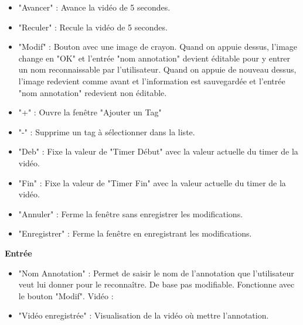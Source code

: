 \documentclass[11pt,french,a4paper]{report}
\begin{document}
\begin{multicols}{2}
\begin{small}
\begin{itemize}[label=, leftmargin=*,parsep=0cm,itemsep=0cm,topsep=0cm]
        \item "Avancer" : Avance la vidéo de 5 secondes.
        \item "Reculer" : Recule la vidéo de 5 secondes.
        \item "Modif" : Bouton avec une image de crayon. Quand on appuie dessus, l'image change en "OK" et l'entrée "nom annotation" devient éditable
        pour y entrer un nom reconnaissable par l'utilisateur. Quand on appuie de nouveau dessus, l'image redevient comme avant et
        l'information est sauvegardée et l'entrée "nom annotation" redevient non éditable.
        \item "+" : Ouvre la fenêtre "Ajouter un Tag"
        \item "-" : Supprime un tag à sélectionner dans la liste.
        \item "Deb" : Fixe la valeur de "Timer Début" avec la valeur actuelle du timer de la vidéo.
        \item "Fin" : Fixe la valeur de "Timer Fin" avec la valeur actuelle du timer de la vidéo.
        \item "Annuler" : Ferme la fenêtre sans enregistrer les modifications.
        \item "Enregistrer" : Ferme la fenêtre en enregistrant les modifications.
    \end{itemize}
\large \textbf{Entrée}\normalsize
    \begin{itemize}[label=, leftmargin=*,parsep=0cm,itemsep=0cm,topsep=0cm]
        \item "Nom Annotation" : Permet de saisir le nom de l'annotation que l'utilisateur veut lui donner pour le reconnaître.
        De base pas modifiable. Fonctionne avec le bouton "Modif".
        Vidéo :
        \item "Vidéo enregistrée" : Visualisation de la vidéo où mettre l'annotation.
    \end{itemize}

\dotfill \\


\end{small}
\end{multicols}
\end{document}
